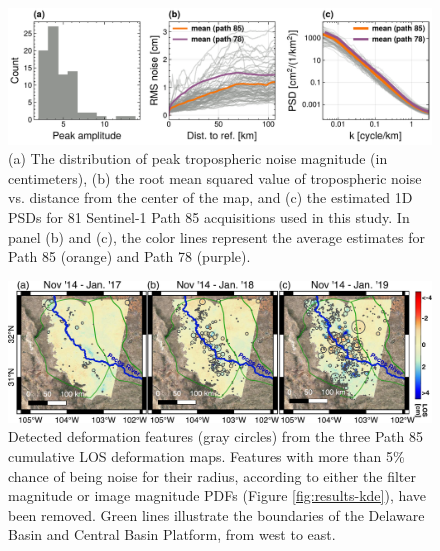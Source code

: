 \begin{figure}
	\centering 
	\includegraphics[width=0.98\linewidth]{figures/chapter6-blobs/figure_discussion_path85_plots.pdf}
	\caption{(a) The distribution of peak tropospheric noise magnitude (in centimeters), (b) the root mean squared value of tropospheric noise vs. distance from the center of the map, and (c) the estimated 1D PSDs for 81 Sentinel-1 Path 85 acquisitions used in this study. In panel (b) and (c), the color lines represent the average estimates for Path 85 (orange) and Path 78 (purple).
	}
	\label{fig:discussion-noise-85}
\end{figure}



\begin{figure}
	\centering 
	\includegraphics[width=0.98\linewidth]{figures/chapter6-blobs/figure_discussion_blobs_combined_path85.pdf}
	\caption{
		Detected deformation features (gray circles) from the three Path 85 cumulative LOS deformation maps. Features with more than 5\% chance of being noise for their radius, according to either the filter magnitude or image magnitude PDFs (Figure \ref{fig:results-kde}), have been removed. Green lines illustrate the boundaries of the Delaware Basin and Central Basin Platform, from west to east.
	}
	\label{fig:discussion-detections-85}
\end{figure}


